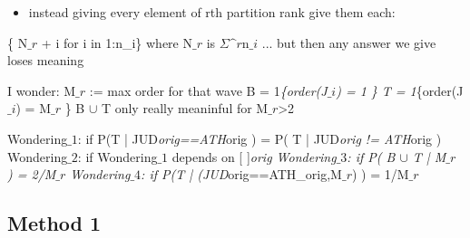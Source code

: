\documentclass[12pt,a4paper]{article}
\begin{document}
\begin{itemize}
\item instead giving every element of rth partition rank  give them each:

\end{itemize}
\{ N\ensuremath{\_r} + i for i in 1:n\_i\}  where N\ensuremath{\_r} is \ensuremath{\Sigma}\ensuremath{\^r}n\ensuremath{\_i} ... but then any answer we give loses meaning

I wonder: M\ensuremath{\_r} := max order for that wave B = 1\emph{\{order(J\ensuremath{\_i}) = 1 \} T = 1}\{order(J\ensuremath{\_i}) = M\ensuremath{\_r} \} B \ensuremath{\cup} T only really meaninful for M\ensuremath{\_r}>2

Wondering\ensuremath{\_1}: if P(T | JUD\emph{orig==ATH}orig ) =  P( T | JUD\emph{orig != ATH}orig ) Wondering\ensuremath{\_2}: if Wondering\ensuremath{\_1} depends on [   ]\emph{orig Wondering\ensuremath{\_3}: if P( B \ensuremath{\cup} T | M\ensuremath{\_r} ) = 2/M\ensuremath{\_r} Wondering\ensuremath{\_4}: if P(T | (JUD}orig==ATH\_orig,M\ensuremath{\_r}) ) = 1/M\ensuremath{\_r}


\subsection{Method 1}
\end{document}
